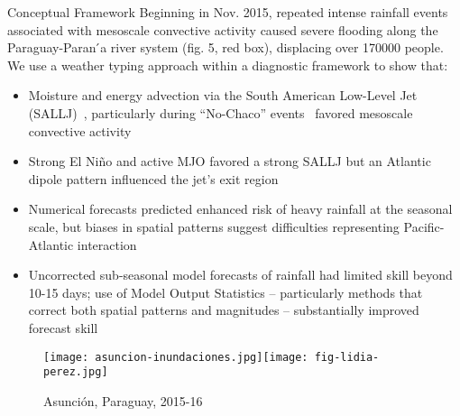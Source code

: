 \begin{block}{Conceptual Framework}
    Beginning in Nov.  2015, repeated intense rainfall events associated with mesoscale convective activity caused severe flooding along the
    Paraguay-Paran ́a river system (fig. 5, red box), displacing over \num{170000} people.
    We use a weather typing approach within a diagnostic framework to show that:
    \begin{itemize}
        \item Moisture and energy advection via the South American Low-Level Jet (SALLJ)~\cite{Marengo:2004kr}, particularly during ``No-Chaco'' events~\cite{Vera:2006ib} favored mesoscale convective activity
        \item Strong El Ni\~{n}o and active MJO favored a strong SALLJ but an Atlantic dipole pattern influenced the jet’s exit region
        \item Numerical forecasts predicted enhanced risk of heavy rainfall at the seasonal scale, but biases in spatial patterns suggest difficulties representing Pacific-Atlantic interaction
        \item Uncorrected sub-seasonal model forecasts of rainfall had limited skill beyond 10-15 days; use of Model Output Statistics –         particularly methods that correct both spatial patterns and magnitudes – substantially improved forecast skill 
    \end{itemize}
    \begin{framed}
        \begin{figure}
            \centering
            \texttt{[image: asuncion-inundaciones.jpg]}\hfill\texttt{[image: fig-lidia-perez.jpg]}
            \caption{Asunci\'{o}n, Paraguay, 2015-16}
            \label{fig:asuncion-flooded}
        \end{figure}
    \end{framed}
\end{block}
